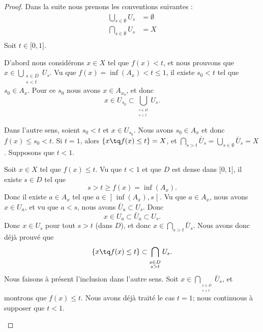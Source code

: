 \begin{proof}
	Dans la suite nous prenons les conventions suivantes :
	\begin{subequations}
		\begin{align}
			\bigcup_{s\in\emptyset}U_s & =\emptyset \\
			\bigcap_{s\in\emptyset}U_s & =X         \\
		\end{align}
	\end{subequations}
	Soit \( t\in\mathopen[ 0 , 1 \mathclose]\).
	\begin{subproof}
		\spitem[\( \{ x\tq f(x)<t \}=\bigcup_{s<t}U_s\)]
		D'abord nous considérons \( x\in X\) tel que \( f(x)<t\), et nous prouvons que $x\in\bigcup_{\substack{s\in D\\s<t}}U_s$. Vu que \( f(x)=\inf(A_x)<t\leq 1\), il existe \( s_0<t\) tel que \( s_0\in A_x\). Pour ce \( s_0\) nous avons \( x\in A_{x_0}\), et donc
		\begin{equation}
			x\in U_{s_0}\subset\bigcup_{_{\substack{s\in D\\s<t}}}U_s.
		\end{equation}

		Dans l'autre sens, soient \( s_0<t\) et \( x\in U_{s_0}\). Nous avons \( s_0\in A_x\) et donc \( f(x)\leq s_0<t\).
		\spitem[\( \{ x\tq f(x)\leq t \}=\bigcup_{s>t}\bar U_s\)]
		Si \( t=1\), alors \( \{ x\tq f(x)\leq t \}=X\), et \( \bigcap_{s>t}\bar U_s=\bigcup_{s\in\emptyset}\bar U_s=X\). Supposons que \( t<1\).

		Soit \( x\in X\) tel que \( f(x)\leq t\). Vu que \( t<1\) et que \( D\) est dense dans \( \mathopen[ 0 , 1 \mathclose]\), il existe \( s\in D\) tel que
		\begin{equation}
			s>t\geq f(x)=\inf(A_x).
		\end{equation}
		Donc il existe \( a\in A_x\) tel que \( a\in\mathopen] \inf(A_x) , s \mathclose[\). Vu que \( a\in A_x\), nous avons \( x\in U_a\), et vu que \( a<s\), nous avons \( \bar U_a\subset U_s\). Donc
			\begin{equation}
				x\in U_a\subset\bar U_a\subset U_s.
			\end{equation}
			Donc \( x\in U_s\) pour tout \( s>t\) (dans \( D\)), et donc \( x\in\bigcap_{s>t}\bar U_s\). Nous avons donc déjà prouvé que
			\begin{equation}
				\{ x\tq f(x)\leq t \}\subset\bigcap_{_{\substack{s\in D\\s>t}}}U_s.
			\end{equation}
			Nous faisons à présent l'inclusion dans l'autre sens. Soit \( x\in \bigcap_{_{\substack{x\in D\\s>t}}}\bar U_s\), et montrons que \( f(x)\leq t\). Nous avons déjà traité le cas \( t=1\); nous continuous à supposer que \( t<1\).


\end{subproof}
\end{proof}
